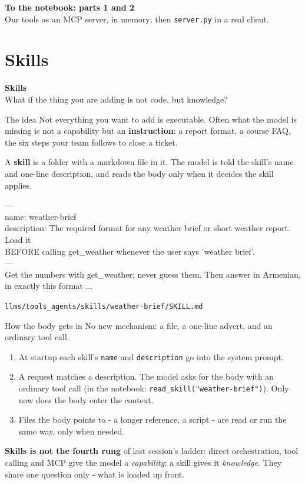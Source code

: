 \documentclass[aspectratio=169]{beamer}
\newcommand{\watchbox}[1]{%
  \begin{tcolorbox}[colback=armorange!12, colframe=armorange, boxrule=0.6pt, arc=2pt]
  #1
  \end{tcolorbox}}
\newcommand{\codebox}[1]{%
  \begin{center}
  \begin{tcolorbox}[colback=lightbg, colframe=gray, boxrule=0.5pt, arc=2pt,
                    width=0.94\textwidth, left=4pt, right=4pt, top=3pt, bottom=3pt]
    \ttfamily\scriptsize #1
  \end{tcolorbox}
  \end{center}}
\newcommand{\sectiontransition}[2]{%
  \begin{frame}[plain]
    \vfill
    \begin{center}
      {\Huge\bfseries\color{popblue} #1}\\[1.1em]
      {\large #2}
    \end{center}
    \vfill
  \end{frame}}
\newcommand{\notebookframe}[2]{%
  \begin{frame}[plain]
    \vfill
    \begin{center}
      {\Large\bfseries\color{paramgreen} To the notebook: #1}\\[1.0em]
      {\large #2}
    \end{center}
    \vfill
  \end{frame}}
\newcommand{\src}[1]{{\scriptsize\color{gray} #1}}
\begin{document}
\notebookframe{parts 1 and 2}{Our tools as an MCP server, in memory; then \texttt{server.py} in a real client.}

\section{Skills}
\sectiontransition{Skills}{What if the thing you are adding is not code, but knowledge?}

\begin{frame}{The idea}
  \vspace{0.4em}
  Not everything you want to add is executable. Often what the model is missing is not a capability but an
  \textbf{instruction}: a report format, a course FAQ, the six steps your team follows to close a ticket.

  \vspace{0.5em}
  A \textbf{skill} is a folder with a markdown file in it. The model is told the skill's name and one-line
  description, and reads the body only when it decides the skill applies.

  \codebox{---\\
  name: weather-brief\\
  description: The required format for any weather brief or short weather report. Load it\\
  \hspace*{1em}BEFORE calling get\_weather whenever the user says 'weather brief'.\\
  ---\\[0.3em]
  Get the numbers with get\_weather; never guess them. Then answer in Armenian, in exactly this format ...}
  \src{\texttt{llms/tools\_agents/skills/weather-brief/SKILL.md}}
\end{frame}

\begin{frame}{How the body gets in}
  \vspace{0.2em}
  {\small No new mechanism: a file, a one-line advert, and an ordinary tool call.}

  \vspace{0.3em}
  \begin{enumerate}
    \item[\textbf{1.}] At startup each skill's \texttt{name} and \texttt{description} go into the system
      prompt.
    \item[\textbf{2.}] A request matches a description. The model asks for the body with an ordinary tool call
      (in the notebook: \texttt{read\_skill("weather-brief")}). Only now does the body enter the context.
    \item[\textbf{3.}] Files the body points to - a longer reference, a script - are read or run the same way,
      only when needed.
  \end{enumerate}

  \vspace{0.3em}
  \watchbox{\small \textbf{Skills is not the fourth rung} of last session's ladder: direct orchestration, tool
  calling and MCP give the model a \emph{capability}; a skill gives it \emph{knowledge}. They share one question
  only - what is loaded up front.}
\end{frame}
\end{document}
